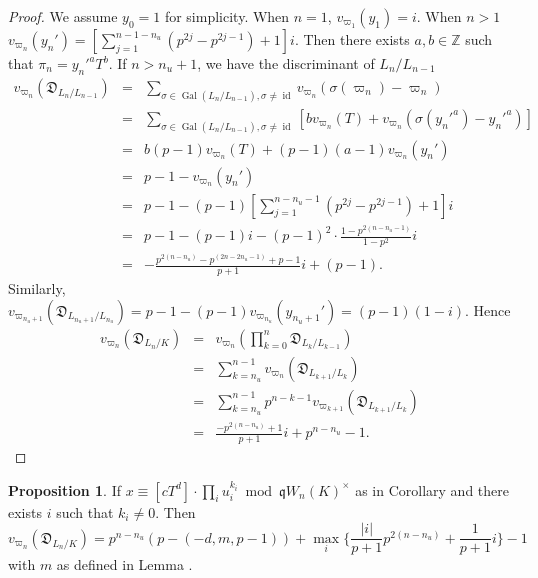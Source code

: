 \documentclass{proc-l}
\theoremstyle{definition}
\newtheorem{proposition}[theorem]{Proposition}
\theoremstyle{remark}
\numberwithin{equation}{section}
\DeclareMathOperator{\Gal}{Gal}
\DeclareMathOperator{\id}{id}
\begin{document}
\begin{proof}
    We assume $y_0=1$ for simplicity. When $n=1$, $v_{\varpi_1}(y_1)=i$. When $n>1$ $v_{\varpi_n}(y_n')=[\sum_{j=1}^{n-1-n_u}(p^{2j}-p^{2j-1})+1]i$. Then there exists $a,b\in\mathbb Z$ such that $\pi_n=y_n'^aT^b$. If $n>n_u+1$, we have the discriminant of $L_n/L_{n-1}$
    \begin{eqnarray*}
    v_{\varpi_n}(\mathfrak D_{L_{n}/L_{n-1}})&=&\sum_{\sigma\in\Gal(L_{n}/L_{n-1}),\sigma\neq\id}v_{\varpi_n}(\sigma(\varpi_n)-\varpi_n)\\
    &=&\sum_{\sigma\in\Gal(L_{n}/L_{n-1}),\sigma\neq\id}[bv_{\varpi_n}(T)+v_{\varpi_n}(\sigma(y_n'^a)-y_n'^a)]\\
    &=&b(p-1)v_{\varpi_n}(T)+(p-1)(a-1)v_{\varpi_n}(y_n')\\
    &=&p-1-v_{\varpi_n}(y_n')\\
    &=&p-1-(p-1)[\sum_{j=1}^{n-n_u-1}(p^{2j}-p^{2j-1})+1]i\\
    &=&p-1-(p-1)i-(p-1)^2\cdot\frac{1-p^{2(n-n_u-1)}}{1-p^2}i\\
    &=&-\frac{p^{2(n-n_u)}-p^{(2n-2n_u-1)}+p-1}{p+1}i+(p-1).
    \end{eqnarray*}
Similarly, $v_{\varpi_{n_u+1}}(\mathfrak D_{L_{n_u+1}/L_{n_u}})=p-1-(p-1)v_{\varpi_{n_u}}(y_{n_u+1}')=(p-1)(1-i)$.
Hence
    \begin{eqnarray*}
    v_{\varpi_n}(\mathfrak D_{L_{n}/K})&=&v_{\varpi_n}(\prod_{k=0}^n\mathfrak D_{L_{k}/L_{k-1}})\\
    &=&\sum_{k=n_u}^{n-1}v_{\varpi_n}(\mathfrak D_{L_{k+1}/L_{{k}}})\\
    &=&\sum_{k=n_u}^{n-1}p^{n-k-1}v_{\varpi_{k+1}}(\mathfrak D_{L_{k+1}/L_{k}})\\
    &=&\frac{-p^{2(n-n_u)}+1}{p+1}i+p^{n-n_u}-1.
    \end{eqnarray*}
\end{proof}
\begin{proposition}\label{4.13}
If $x\equiv [cT^d]\cdot\prod_iu_i^{k_i}\bmod\mathfrak qW_n(K)^\times$ as in Corollary \boxed{\ref{3.8}} and there exists $i$ such that $k_i\neq0$. Then $$v_{\varpi_n}(\mathfrak D_{L_{n}/K})=p^{n-n_u}(p-{(-d,m,p-1)})+\max_{i}\{\frac{|i|}{p+1}p^{2(n-n_u)}+\frac{1}{p+1}i\}-1$$
with $m$ as defined in Lemma \boxed{\ref{5.14}}.
\end{proposition}
\end{document}
